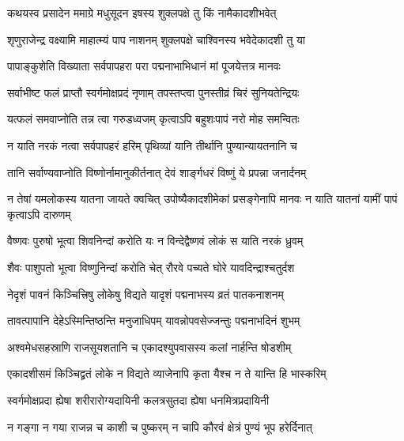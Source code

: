 \label{sec:padma-ashvina-shukla-pashankusha}



\twolineshloka
{कथयस्व प्रसादेन ममाग्रे मधुसूदन}
{इषस्य शुक्लपक्षे तु किं नामैकादशीभवेत्}%


\twolineshloka
{शृणुराजेन्द्र वक्ष्यामि माहात्म्यं पाप नाशनम्}
{शुक्लपक्षे चाश्विनस्य भवेदेकादशी तु या}%

\twolineshloka
{पापाङ्कुशेति विख्याता सर्वपापहरा परा}
{पद्मनाभाभिधानं मां पूजयेत्तत्र मानवः}%

\twolineshloka
{सर्वाभीष्ट फलं प्राप्तौ स्वर्गमोक्षप्रदं नृणाम्}
{तपस्तप्त्वा पुनस्तीव्रं चिरं सुनियतेन्द्रियः}%

\twolineshloka
{यत्फलं समवाप्नोति तन्न त्वा गरुडध्वजम्}
{कृत्वाऽपि बहुशःपापं नरो मोह समन्वितः}%

\twolineshloka
{न याति नरकं नत्वा सर्वपापहरं हरिम्}
{पृथिव्यां यानि तीर्थानि पुण्यान्यायतनानि च}%

\twolineshloka
{तानि सर्वाण्यवाप्नोति विष्णोर्नामानुकीर्तनात्}
{देवं शार्ङ्गधरं विष्णुं ये प्रपन्ना जनार्दनम्}%

\threelineshloka
{न तेषां यमलोकस्य यातना जायते क्वचित्}
{उपोष्यैकादशीमेकां प्रसङ्गेनापि मानवः}
{न याति यातनां यामीं पापं कृत्वाऽपि दारुणम्}%

\twolineshloka
{वैष्णवः पुरुषो भूत्वा शिवनिन्दां करोति यः}
{न विन्देद्वैष्णवं लोकं स याति नरकं ध्रुवम्}%

\twolineshloka
{शैवः पाशुपतो भूत्वा विष्णुनिन्दां करोति चेत्}
{रौरवे पच्यते घोरे यावदिन्द्राश्चतुर्दश}%

\twolineshloka
{नेदृशं पावनं किञ्चित्त्रिषु लोकेषु विद्यते}
{यादृशं पद्मनाभस्य व्रतं पातकनाशनम्}%

\twolineshloka
{तावत्पापानि देहेऽस्मिन्तिष्ठन्ति मनुजाधिपम्}
{यावन्नोपवसेज्जन्तुः पद्मनाभदिनं शुभम्}%

\twolineshloka
{अश्वमेधसहस्राणि राजसूयशतानि च}
{एकादश्युपवासस्य कलां नार्हन्ति षोडशीम्}%

\twolineshloka
{एकादशीसमं किञ्चिद्व्रतं लोके न विद्यते}
{व्याजेनापि कृता यैश्च न ते यान्ति हि भास्करिम्}%

\twolineshloka
{स्वर्गमोक्षप्रदा ह्येषा शरीरारोग्यदायिनी}
{कलत्रसुतदा ह्येषा धनमित्रप्रदायिनी}%

\twolineshloka
{न गङ्गा न गया राजन्न च काशी च पुष्करम्}
{न चापि कौरवं क्षेत्रं पुण्यं भूप हरेर्दिनात्}%

